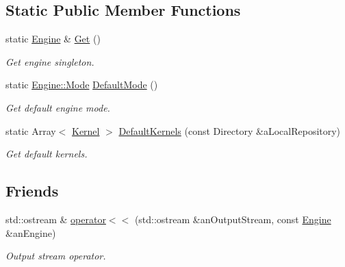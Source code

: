 \subsection*{Static Public Member Functions}
\begin{DoxyCompactItemize}
\item 
static \hyperlink{classostk_1_1physics_1_1env_1_1ephem_1_1spice_1_1_engine}{Engine} \& \hyperlink{classostk_1_1physics_1_1env_1_1ephem_1_1spice_1_1_engine_a98ce9249db18853920308c699fbca541}{Get} ()
\begin{DoxyCompactList}\small\item\em Get engine singleton. \end{DoxyCompactList}\item 
static \hyperlink{classostk_1_1physics_1_1env_1_1ephem_1_1spice_1_1_engine_a803b82d8f41c81e861852098b6b75ae2}{Engine\+::\+Mode} \hyperlink{classostk_1_1physics_1_1env_1_1ephem_1_1spice_1_1_engine_a6b8bdf7ead864216cd07fc9d81fab39b}{Default\+Mode} ()
\begin{DoxyCompactList}\small\item\em Get default engine mode. \end{DoxyCompactList}\item 
static Array$<$ \hyperlink{classostk_1_1physics_1_1env_1_1ephem_1_1spice_1_1_kernel}{Kernel} $>$ \hyperlink{classostk_1_1physics_1_1env_1_1ephem_1_1spice_1_1_engine_a719948b0aaa86f50f832db8488c5b1f2}{Default\+Kernels} (const Directory \&a\+Local\+Repository)
\begin{DoxyCompactList}\small\item\em Get default kernels. \end{DoxyCompactList}\end{DoxyCompactItemize}
\subsection*{Friends}
\begin{DoxyCompactItemize}
\item 
std\+::ostream \& \hyperlink{classostk_1_1physics_1_1env_1_1ephem_1_1spice_1_1_engine_a880dd680a3b5444757480fafd1a52679}{operator$<$$<$} (std\+::ostream \&an\+Output\+Stream, const \hyperlink{classostk_1_1physics_1_1env_1_1ephem_1_1spice_1_1_engine}{Engine} \&an\+Engine)
\begin{DoxyCompactList}\small\item\em Output stream operator. \end{DoxyCompactList}\end{DoxyCompactItemize}


